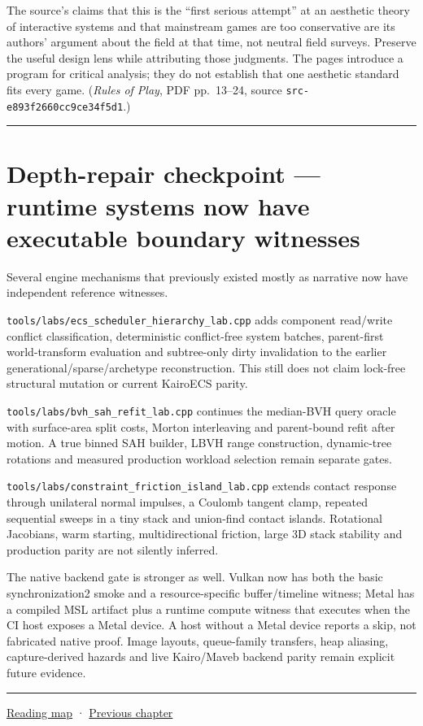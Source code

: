 The source's claims that this is the ``first serious attempt'' at an aesthetic theory of interactive systems and that mainstream games are too conservative are its authors' argument about the field at that time, not neutral field surveys. Preserve the useful design lens while attributing those judgments. The pages introduce a program for critical analysis; they do not establish that one aesthetic standard fits every game. (\emph{Rules of Play}, PDF pp.~13--24, source \texttt{src-e893f2660cc9ce34f5d1}.)

\begin{center}\rule{0.5\linewidth}{0.5pt}\end{center}

\section{Depth-repair checkpoint --- runtime systems now have executable boundary witnesses}\label{06-engine-ii-ch047-depth-repair-checkpoint-runtime-systems-now-have-executable-boundary-witnesses}

Several engine mechanisms that previously existed mostly as narrative now have independent reference witnesses.

\texttt{tools/labs/ecs\_scheduler\_hierarchy\_lab.cpp} adds component read/write conflict classification, deterministic conflict-free system batches, parent-first world-transform evaluation and subtree-only dirty invalidation to the earlier generational/sparse/archetype reconstruction. This still does not claim lock-free structural mutation or current KairoECS parity.

\texttt{tools/labs/bvh\_sah\_refit\_lab.cpp} continues the median-BVH query oracle with surface-area split costs, Morton interleaving and parent-bound refit after motion. A true binned SAH builder, LBVH range construction, dynamic-tree rotations and measured production workload selection remain separate gates.

\texttt{tools/labs/constraint\_friction\_island\_lab.cpp} extends contact response through unilateral normal impulses, a Coulomb tangent clamp, repeated sequential sweeps in a tiny stack and union-find contact islands. Rotational Jacobians, warm starting, multidirectional friction, large 3D stack stability and production parity are not silently inferred.

The native backend gate is stronger as well. Vulkan now has both the basic synchronization2 smoke and a resource-specific buffer/timeline witness; Metal has a compiled MSL artifact plus a runtime compute witness that executes when the CI host exposes a Metal device. A host without a Metal device reports a skip, not fabricated native proof. Image layouts, queue-family transfers, heap aliasing, capture-derived hazards and live Kairo/Maveb backend parity remain explicit future evidence.

\begin{center}\rule{0.5\linewidth}{0.5pt}\end{center}

\hyperref[volume-reading-map]{Reading map} · \hyperref[06-engine-ii-ch046-game-design-from-mechanics-to-narrative-interfaces]{Previous chapter}
